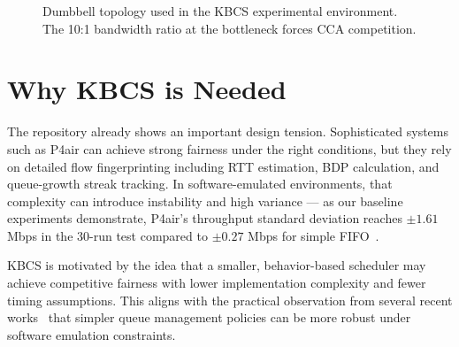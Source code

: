 \documentclass[12pt,a4paper]{report}
\begin{document}
\begin{figure}[H]
\centering
{}
\caption{Dumbbell topology used in the KBCS experimental environment. The 10:1 bandwidth ratio at the bottleneck forces CCA competition.}
\label{fig:dumbbell_topology}
\end{figure}

\section{Why KBCS is Needed}
The repository already shows an important design tension. Sophisticated systems such as P4air can achieve strong fairness under the right conditions, but they rely on detailed flow fingerprinting including RTT estimation, BDP calculation, and queue-growth streak tracking. In software-emulated environments, that complexity can introduce instability and high variance — as our baseline experiments demonstrate, P4air's throughput standard deviation reaches $\pm 1.61$ Mbps in the 30-run test compared to $\pm 0.27$ Mbps for simple FIFO~\cite{repo}.

KBCS is motivated by the idea that a smaller, behavior-based scheduler may achieve competitive fairness with lower implementation complexity and fewer timing assumptions. This aligns with the practical observation from several recent works~\cite{buffermgmt, ccaaware} that simpler queue management policies can be more robust under software emulation constraints.
\end{document}
